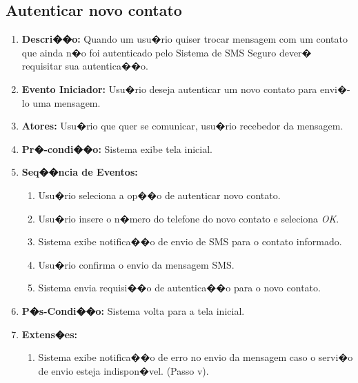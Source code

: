 \documentclass[a4paper,capchap,espacoduplo,normaltoc]{abntepusp}
\begin{document}
\subsection{Autenticar novo contato}
		\begin{enumerate}
		\item \textbf{Descri��o:} Quando um usu�rio quiser trocar mensagem com um contato que ainda n�o foi autenticado pelo Sistema de SMS Seguro dever� requisitar sua autentica��o.
		\item \textbf{Evento Iniciador:} Usu�rio deseja autenticar um novo contato para envi�-lo uma mensagem.
		\item \textbf{Atores:} Usu�rio que quer se comunicar, usu�rio recebedor da mensagem.
		\item \textbf{Pr�-condi��o:} Sistema exibe tela inicial.
		\item \textbf{Seq��ncia de Eventos:} 
		\begin{enumerate}
			\item Usu�rio seleciona a op��o de autenticar novo contato.
			\item Usu�rio insere o n�mero do telefone do novo contato e seleciona \emph{OK}.
			\item Sistema exibe notifica��o de envio de SMS para o contato informado.
			\item Usu�rio confirma o envio da mensagem SMS.
			\item Sistema envia requisi��o de autentica��o para o novo contato.
		\end{enumerate}
    \item \textbf{P�s-Condi��o:} Sistema volta para a tela inicial.
		\item \textbf{Extens�es:} 
		\begin{enumerate}
			\item Sistema exibe notifica��o de erro no envio da mensagem caso o servi�o de envio esteja indispon�vel. (Passo v).
		\end{enumerate}
		\end{enumerate}
	
\end{document}
